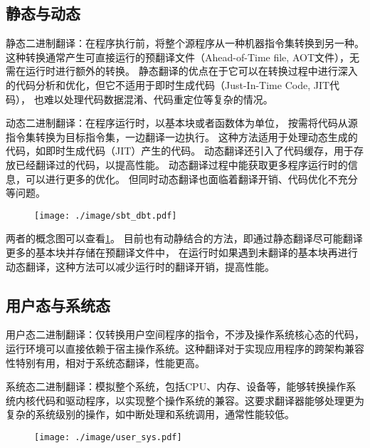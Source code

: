 \subsection{静态与动态}
静态二进制翻译：在程序执行前，将整个源程序从一种机器指令集转换到另一种。
这种转换通常产生可直接运行的预翻译文件（Ahead-of-Time file, AOT文件），无需在运行时进行额外的转换。
静态翻译的优点在于它可以在转换过程中进行深入的代码分析和优化，但它不适用于即时生成代码（Just-In-Time Code, JIT代码），
也难以处理代码数据混淆、代码重定位等复杂的情况。

动态二进制翻译：在程序运行时，以基本块或者函数体为单位，
按需将代码从源指令集转换为目标指令集，一边翻译一边执行。
这种方法适用于处理动态生成的代码，如即时生成代码（JIT）产生的代码。
动态翻译还引入了代码缓存，用于存放已经翻译过的代码，以提高性能。
动态翻译过程中能获取更多程序运行时的信息，可以进行更多的优化。
但同时动态翻译也面临着翻译开销、代码优化不充分等问题。

\begin{figure}[!htbp]
  \centering
  \texttt{[image: ./image/sbt\_dbt.pdf]}
  \label{img:sbt_dbt}
\end{figure}

两者的概念图可以查看\ref{img:sbt_dbt}。
目前也有动静结合的方法，即通过静态翻译尽可能翻译更多的基本块并存储在预翻译文件中，
在运行时如果遇到未翻译的基本块再进行动态翻译，这种方法可以减少运行时的翻译开销，提高性能。

\subsection{用户态与系统态}
用户态二进制翻译：仅转换用户空间程序的指令，不涉及操作系统核心态的代码，运行环境可以直接依赖于宿主操作系统。这种翻译对于实现应用程序的跨架构兼容性特别有用，相对于系统态翻译，性能更高。

系统态二进制翻译：模拟整个系统，包括CPU、内存、设备等，能够转换操作系统内核代码和驱动程序，以实现整个操作系统的兼容。这要求翻译器能够处理更为复杂的系统级别的操作，如中断处理和系统调用，通常性能较低。

\begin{figure}[!htbp]
  \centering
  \texttt{[image: ./image/user\_sys.pdf]}
  \label{img:user_sys}
\end{figure}

